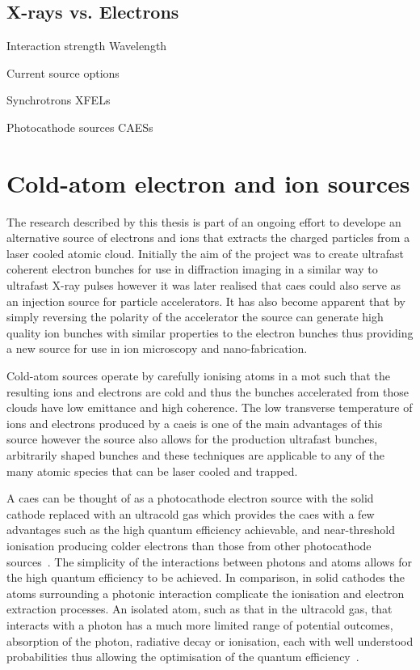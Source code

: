 \subsection{X-rays vs. Electrons}



Interaction strength
Wavelength

Current source options

Synchrotrons
XFELs

Photocathode sources
CAESs

\section{Cold-atom electron and ion sources}

The research described by this thesis is part of an ongoing effort to develope an alternative source of electrons and ions that extracts the charged particles from a laser cooled atomic cloud.
Initially the aim of the project was to create ultrafast coherent electron bunches for use in diffraction imaging in a similar way to ultrafast X-ray pulses however it was later realised that \gls{caes} could also serve as an injection source for particle accelerators.
It has also become apparent that by simply reversing the polarity of the accelerator the source can generate high quality ion bunches with similar properties to the electron bunches thus providing a new source for use in ion microscopy and nano-fabrication.

Cold-atom sources operate by carefully ionising atoms in a \gls{mot} such that the resulting ions and electrons are cold and thus the bunches accelerated from those clouds have low emittance and high coherence.
The low transverse temperature of ions and electrons produced by a \gls{caeis} is one of the main advantages of this source however the source also allows for the production ultrafast bunches, arbitrarily shaped bunches and these techniques are applicable to any of the many atomic species that can be laser cooled and trapped.

A \gls{caes} can be thought of as a photocathode electron source with the solid cathode replaced with an ultracold gas which provides the \gls{caes} with a few advantages such as the high quantum efficiency achievable, and near-threshold ionisation producing colder electrons than those from other photocathode sources~\cite{engelen_effective_2014}.
The simplicity of the interactions between photons and atoms allows for the high quantum efficiency to be achieved.
In comparison, in solid cathodes the atoms surrounding a photonic interaction complicate the ionisation and electron extraction processes.
An isolated atom, such as that in the ultracold gas, that interacts with a photon has a much more limited range of potential outcomes, absorption of the photon, radiative decay or ionisation, each with well understood probabilities thus allowing the optimisation of the quantum efficiency~\cite{baranov_field_1994}.

